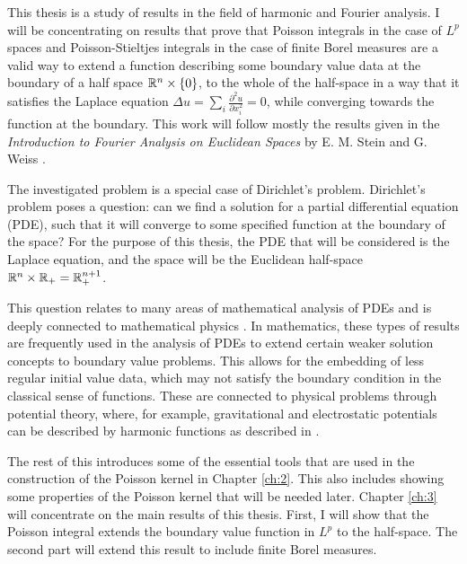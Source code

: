 This thesis is a study of results in the field of harmonic and Fourier analysis. I will be concentrating on results that prove that Poisson integrals in the case of $L^p$ spaces and Poisson-Stieltjes integrals in the case of finite Borel measures are a valid way to extend a function describing some boundary value data at the boundary of a half space $\mathbb R^n\times\{0\}$, to the whole of the half-space in a way that it satisfies the Laplace equation $\Delta u=\sum_i \frac{\partial^2 u}{\partial x_i^2}=0$, while converging towards the function at the boundary. This work will follow mostly the results given in the \textit{Introduction to Fourier Analysis on Euclidean Spaces} by E. M. Stein and G. Weiss \cite{stein_weiss}.

The investigated problem is a special case of Dirichlet's problem. Dirichlet's problem poses a question: can we find a solution for a partial differential equation (PDE), such that it will converge to some specified function at the boundary of the space? For the purpose of this thesis, the PDE that will be considered is the Laplace equation, and the space will be the Euclidean half-space $\mathbb R^n\times\mathbb R_+=\mathbb R^{n+1}_+$.

This question relates to many areas of mathematical analysis of PDEs \cite{evans, John1978} and is deeply connected to mathematical physics \cite{hilbert}. In mathematics, these types of results are frequently used in the analysis of PDEs to extend certain weaker solution concepts to boundary value problems. This allows for the embedding of less regular initial value data, which may not satisfy the boundary condition in the classical sense of functions. These are connected to physical problems through potential theory, where, for example, gravitational and electrostatic potentials can be described by harmonic functions as described in \cite{hilbert}.

The rest of this introduces some of the essential tools that are used in the construction of the Poisson kernel in Chapter \ref{ch:2}. This also includes showing some properties of the Poisson kernel that will be needed later. Chapter \ref{ch:3} will concentrate on the main results of this thesis. First, I will show that the Poisson integral extends the boundary value function in $L^p$ to the half-space. The second part will extend this result to include finite Borel measures.
